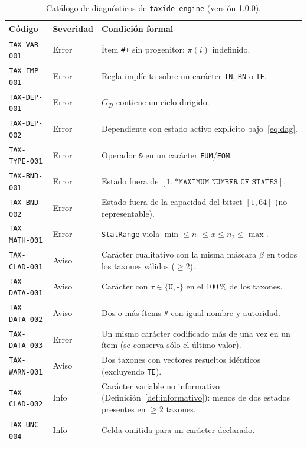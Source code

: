 \documentclass[11pt,a4paper]{article}
\newcommand{\taxideversion}{1.0.0}
\theoremstyle{definition}
\theoremstyle{remark}
\begin{document}
\begin{table}[ht]
\centering
\small
\caption{Catálogo de diagnósticos de \texttt{taxide-engine} (versión \taxideversion).}
\label{tab:diagnosticos}
\begin{tabularx}{\textwidth}{@{}l l X@{}}
\toprule
\textbf{Código} & \textbf{Severidad} & \textbf{Condición formal} \\
\midrule
\texttt{TAX-VAR-001} & Error & Ítem \texttt{\#+} sin progenitor: $\pi(i)$ indefinido. \\
\texttt{TAX-IMP-001} & Error & Regla implícita sobre un carácter \texttt{IN}, \texttt{RN} o \texttt{TE}. \\
\texttt{TAX-DEP-001} & Error & $G_{\mathcal{D}}$ contiene un ciclo dirigido. \\
\texttt{TAX-DEP-002} & Error & Dependiente con estado activo explícito bajo~\eqref{eq:dag}. \\
\texttt{TAX-TYPE-001} & Error & Operador \texttt{\&} en un carácter \texttt{EUM}/\texttt{EOM}. \\
\texttt{TAX-BND-001} & Error & Estado fuera de $[1, \texttt{*MAXIMUM NUMBER OF STATES}]$. \\
\texttt{TAX-BND-002} & Error & Estado fuera de la capacidad del bitset $[1,64]$ (no representable). \\
\texttt{TAX-MATH-001} & Error & \texttt{StatRange} viola $\min \le n_1 \le \tilde{x} \le n_2 \le \max$. \\
\texttt{TAX-CLAD-001} & Aviso & Carácter cualitativo con la misma máscara $\beta$ en todos los taxones válidos ($\ge 2$). \\
\texttt{TAX-DATA-001} & Aviso & Carácter con $\tau \in \{\texttt{U}, \texttt{-}\}$ en el 100\,\% de los taxones. \\
\texttt{TAX-DATA-002} & Aviso & Dos o más ítems \texttt{\#} con igual nombre y autoridad. \\
\texttt{TAX-DATA-003} & Error & Un mismo carácter codificado más de una vez en un ítem (se conserva sólo el último valor). \\
\texttt{TAX-WARN-001} & Aviso & Dos taxones con vectores resueltos idénticos (excluyendo \texttt{TE}). \\
\texttt{TAX-CLAD-002} & Info & Carácter variable no informativo (Definición~\ref{def:informativo}): menos de dos estados presentes en $\ge 2$ taxones. \\
\texttt{TAX-UNC-004} & Info & Celda omitida para un carácter declarado. \\
\bottomrule
\end{tabularx}
\end{table}
\end{document}
